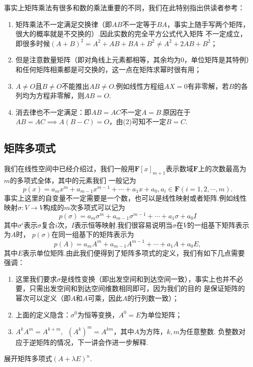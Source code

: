 事实上矩阵乘法有很多和数的乘法重要的不同，我们在此特别指出供读者参考：
\begin{enumerate}
    \item 矩阵乘法不一定满足交换律（即$AB$不一定等于$BA$，事实上随手写两个矩阵，很大的概率就是不交换的）.因此实数的完全平方公式代入矩阵
    不一定成立，即很多时候$(A+B)^2=A^2+AB+BA+B^2\neq A^2+2AB+B^2$；
    
    \item 但是注意数量矩阵（即对角线上元素都相等，其余均为0，单位矩阵是其特例）和任何矩阵相乘都是可交换的，这一点在矩阵求幂时很有用；
    \item $A\neq O$且$B\neq O$不能推出$AB\neq O$.例如线性方程组$AX = 0$有非零解，若$B$的各列均为方程非零解，则$AB = O$.
    \item 消去律也不一定满足：即$AB = AC$不一定$A = B$.原因在于$AB=AC \implies A(B-C)=O$，由(2)可知不一定$B = C$.
\end{enumerate}

\subsection{矩阵多项式}
我们在线性空间中已经介绍过，我们一般用$\mathbf{F}[x]_{m+1}$表示数域$\mathbf{F}$上的次数最高为$m$的多项式全体，其中的元素我们
一般记为
\[p(x)=a_mx^m+a_{m-1}x^{m-1}+\cdots+a_1x+a_0,a_i\in\mathbf{F}(i=1,2,\cdots,m).\]
事实上这里的自变量不一定需要是一个数，也可以是线性映射或者矩阵.例如线性映射$\sigma:V\to V$构成的$m$次多项式可以记为
\[p(\sigma)=a_m\sigma^m+a_{m-1}\sigma^{m-1}+\cdots+a_1\sigma+a_0I\]
其中$\sigma^i$表示$\sigma$复合$i$次，$I$表示恒等映射.我们很容易说明当$\sigma$在$V$的一组基下矩阵表示为$A$时，
$p(\sigma)$在同一组基下的矩阵表示为
\[p(A)=a_mA^m+a_{m-1}A^{m-1}+\cdots+a_1A+a_0E,\]
其中$E$表示单位矩阵.由此我们便得到了矩阵多项式的定义，我们有如下几点需要强调：
\begin{enumerate}
    \item 这里我们要求$\sigma$是线性变换（即出发空间和到达空间一致），事实上也并不必要，只需出发空间和到达空间维数相同即可，因为我们的目的
    是保证矩阵的幂次可以定义（即$A$和$A$可乘，因此$A$的行列数一致）；
    \item 上面的定义隐含：$\sigma^0$为恒等变换，$A^0=E$为单位矩阵；
    \item $A^kA^m=A^{k+m},\enspace (A^k)^m=A^{km}$，其中$A$为方阵，$k,m$为任意整数. 负整数对应于逆矩阵的情况，下一讲会作进一步解释.
\end{enumerate}
\begin{example}
    展开矩阵多项式$(A+\lambda E)^n$.
\end{example}
\begin{solution}

\end{solution}

